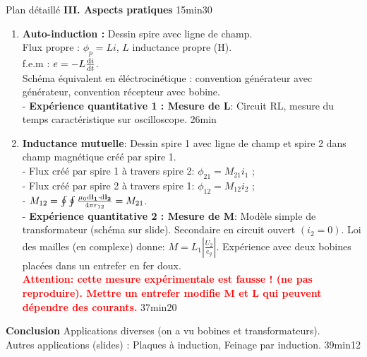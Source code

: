 \begin{reportBlock}{Plan détaillé}
\vspace{1cm}
\textbf{III. Aspects pratiques} 15min30
\begin{enumerate}
    \item \textbf{Auto-induction :} Dessin spire avec ligne de champ. \\
    Flux propre : $\phi_p = L i$, $L$ inductance propre (H). \\
    f.e.m : $e = - L \frac{\mathrm{d} i}{\mathrm{d} t}$. \\
    Schéma équivalent en éléctrocinétique : convention générateur avec générateur, convention récepteur avec bobine. \\
    - \textbf{Expérience quantitative 1 : Mesure de L}: Circuit RL, mesure du temps caractéristique sur oscilloscope.
    26min
    \item \textbf{Inductance mutuelle}: Dessin spire 1 avec ligne de champ et spire 2 dans champ magnétique créé par spire 1. \\
    - Flux créé par spire 1 à travers spire 2: $\phi_{21} = M_{21} i_1$ ; \\
    - Flux créé par spire 2 à travers spire 1: $\phi_{12} = M_{12} i_2$ ; \\
    - $M_{12} = \oint \oint \frac{\mu_0 \mathrm{d} \mathbf{l_1} \cdot \mathrm{d} \mathbf{l_2}}{4 \pi r_{12}} = M_{21}$. \\
     - \textbf{Expérience quantitative 2 : Mesure de M}: Modèle simple de transformateur (schéma sur slide). Secondaire en circuit ouvert $(i_2 = 0)$. Loi des mailles (en complexe) donne: $ M = L_1 \left| \frac{U_2}{e_g} \right|$. Expérience avec deux bobines placées dans un entrefer en fer doux. \\
     \textbf{\textcolor{red}{Attention: cette mesure expérimentale est fausse ! (ne pas reproduire). Mettre un entrefer modifie M et L qui peuvent dépendre des courants.}}
     \newline 37min20
\end{enumerate}

\vspace{1cm}
\textbf{Conclusion} Applications diverses (on a vu bobines et transformateurs). \\
Autres applications (slides) : Plaques à induction, Feinage par induction.\newline
39min12
\end{reportBlock}


